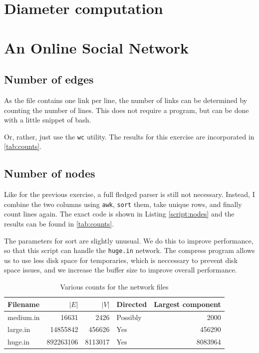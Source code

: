 \documentclass[12pt,a4paper,hidelinks]{article}
\begin{document}
\section{Diameter computation}

\section{An Online Social Network}

\subsection{Number of edges}

As the file contains one link per line, the number of links can be determined by counting the number of lines. This does not require a program, but can be done with a little snippet of bash.



Or, rather, just use the \texttt{wc} utility. The results for this exercise are incorporated in \autoref{tab:counts}.

\subsection{Number of nodes}

Like for the previous exercise, a full fledged parser is still not necessary. Instead, I combine the two columns using \texttt{awk}, \texttt{sort} them, take unique rows, and finally count lines again. The exact code is shown in Listing \ref{script:nodes} and the results can be found in \autoref{tab:counts}.



The parameters for sort are slightly unusual. We do this to improve performance, so that this script can handle the \texttt{huge.in} network. The compress program allows us to use less disk space for temporaries, which is neccessary to prevent disk space issues, and we increase the buffer size to improve overall performance.

\begin{table}
\centering
\begin{tabular}{l | r | r | l | r}
Filename & {\centering $|E|$} & $|V|$ & Directed & Largest component\\
\hline
medium.in & 16631 & 2426 & Possibly & 2000 \\
large.in & 14855842 & 456626 & Yes & 456290 \\
huge.in & 892263106 & 8113017 & Yes & 8083964
\end{tabular}
\caption{Various counts for the network files}
\label{tab:counts}
\end{table}
\end{document}
